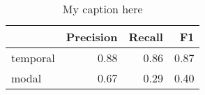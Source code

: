 \begin{table}[!ht]
\centering
\begin{tabular}{lrrr}
\toprule
{} &  Precision &  Recall &   F1 \\
\midrule
temporal &       0.88 &    0.86 & 0.87 \\
modal    &       0.67 &    0.29 & 0.40 \\
\bottomrule
\end{tabular}
\caption{My caption here}
\label{tab:DEICTICITY-ocd-combined-F1}
\end{table}